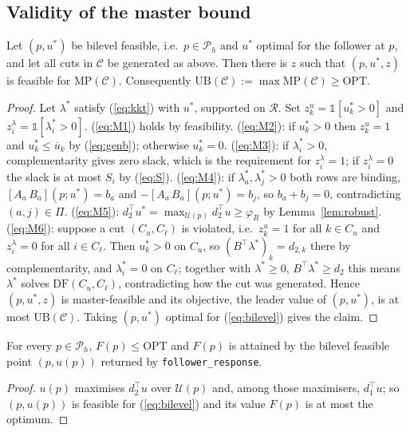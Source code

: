 \subsection{Validity of the master bound}
\begin{theorem}\label{thm:relax}
Let $(p,u^\ast)$ be bilevel feasible, i.e.\ $p\in\mathcal P_h$ and $u^\ast$ optimal for the
follower at $p$, and let all cuts in $\mathcal C$ be generated as above. Then there is
$z$ such that $(p,u^\ast,z)$ is feasible for $\mathrm{MP}(\mathcal C)$. Consequently
$\mathrm{UB}(\mathcal C):=\max\mathrm{MP}(\mathcal C)\ge\mathrm{OPT}$.
\end{theorem}
\begin{proof}
Let $\lambda^\ast$ satisfy (\ref{eq:kkt}) with $u^\ast$, supported on $\mathcal R$. Set
$z^u_k=\mathbb 1[u^\ast_k>0]$ and $z^\lambda_i=\mathbb 1[\lambda^\ast_i>0]$.
(\ref{eq:M1}) holds by feasibility. (\ref{eq:M2}): if $u^\ast_k>0$ then $z^u_k=1$ and
$u^\ast_k\le\overline u_k$ by (\ref{eq:genb}); otherwise $u_k^\ast=0$.
(\ref{eq:M3}): if $\lambda^\ast_i>0$, complementarity gives zero slack, which is the
requirement for $z^\lambda_i=1$; if $z^\lambda_i=0$ the slack is at most $S_i$ by (\ref{eq:S}).
(\ref{eq:M4}): if $\lambda^\ast_a,\lambda^\ast_j>0$ both rows are binding,
$[A_a\,B_a](p;u^\ast)=b_a$ and $-[A_a\,B_a](p;u^\ast)=b_j$, so $b_a+b_j=0$, contradicting
$(a,j)\in\Pi$. (\ref{eq:M5}): $d_2^\top u^\ast=\max_{\mathcal U(p)}d_2^\top u\ge\varphi_R$ by
Lemma~\ref{lem:robust}. (\ref{eq:M6}): suppose a cut $(C_u,C_\ell)$ is violated, i.e.\
$z^u_k=1$ for all $k\in C_u$ and $z^\lambda_i=0$ for all $i\in C_\ell$. Then $u^\ast_k>0$ on $C_u$,
so $(B^\top\lambda^\ast)_k=d_{2,k}$ there by complementarity, and $\lambda^\ast_i=0$ on $C_\ell$;
together with $\lambda^\ast\ge0$, $B^\top\lambda^\ast\ge d_2$ this means $\lambda^\ast$ solves
$\mathrm{DF}(C_u,C_\ell)$, contradicting how the cut was generated. Hence $(p,u^\ast,z)$ is
master-feasible and its objective, the leader value of $(p,u^\ast)$, is at most
$\mathrm{UB}(\mathcal C)$. Taking $(p,u^\ast)$ optimal for (\ref{eq:bilevel}) gives the claim.
\end{proof}

\begin{lemma}\label{lem:attained}
For every $p\in\mathcal P_h$, $F(p)\le\mathrm{OPT}$ and $F(p)$ is attained by the bilevel
feasible point $(p,u(p))$ returned by \texttt{follower\_response}.
\end{lemma}
\begin{proof}
$u(p)$ maximises $d_2^\top u$ over $\mathcal U(p)$ and, among those maximisers, $d_1^\top u$;
so $(p,u(p))$ is feasible for (\ref{eq:bilevel}) and its value $F(p)$ is at most the
optimum.
\end{proof}

